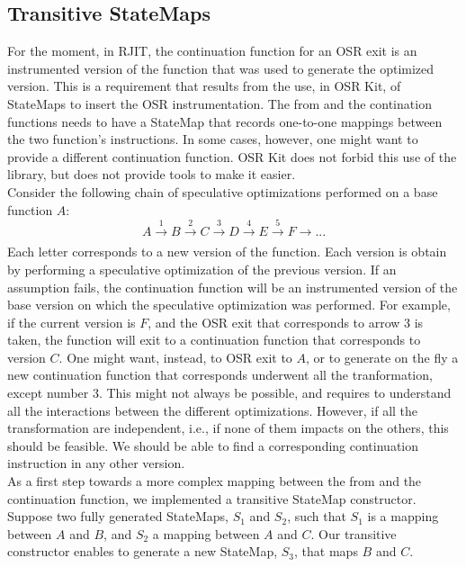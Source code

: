 \subsection{Transitive StateMaps}
For the moment, in RJIT, the continuation function for an OSR exit is an instrumented version of the function that was used to generate the optimized version.
This is a requirement that results from the use, in OSR Kit\cite{OSRKit}, of StateMaps to insert the OSR instrumentation.
The from and the contination functions needs to have a StateMap that records one-to-one mappings between the two function's instructions.
In some cases, however, one might want to provide a different continuation function.
OSR Kit does not forbid this use of the library, but does not provide tools to make it easier.\\  

Consider the following chain of speculative optimizations performed on a base function $A$: 
$$A \xrightarrow[]{1} B \xrightarrow[]{2} C \xrightarrow[]{3} D \xrightarrow[]{4} E \xrightarrow[]{5} F \rightarrow ...$$
Each letter corresponds to a new version of the function. 
Each version is obtain by performing a speculative optimization of the previous version.
If an assumption fails, the continuation function will be an instrumented version of the base version on which the speculative optimization was performed.
For example, if the current version is $F$, and the OSR exit that corresponds to arrow 3 is taken, 
the function will exit to a continuation function that corresponds to version $C$.
One might want, instead, to OSR exit to $A$, or to generate on the fly a new continuation function that corresponds underwent all the tranformation, except number 3. 
This might not always be possible, and requires to understand all the interactions between the different optimizations.
However, if all the transformation are independent, i.e., if none of them impacts on the others, this should be feasible.
We should be able to find a corresponding continuation instruction in any other version.\\

As a first step towards a more complex mapping between the from and the continuation function, we implemented a transitive StateMap constructor.
Suppose two fully generated StateMaps, $S_1$ and $S_2$, such that $S_1$ is a mapping between $A$ and $B$, and $S_2$ a mapping between $A$ and $C$.
Our transitive constructor enables to generate a new StateMap, $S_3$, that maps $B$ and $C$.\\

